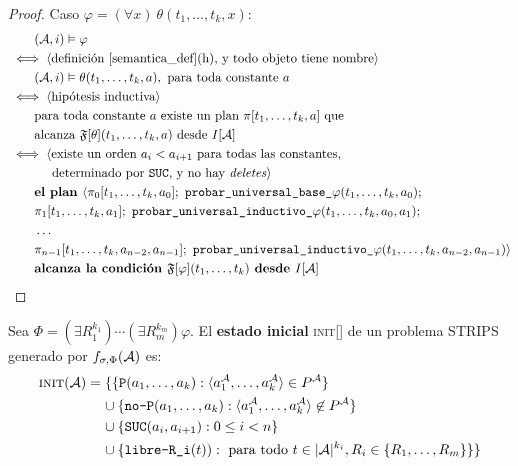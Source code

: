 \begin{proof}
Caso $\varphi = (\forall x)\ \theta(t_1,\ldots,t_k,x):$
\begin{alignat*}{1}
& \quad \quad (\A, i) \models \varphi\\
& \iff \tup{\text{definición \ref{semantica_def}(h), y todo objeto tiene nombre}}\\
& \quad \quad (\A, i) \models \theta(t_1,\ldots,t_k,a), \text{ para toda
constante $a$}\\
& \iff \tup{\text{hipótesis inductiva}}\\
& \quad\quad \text{para toda constante $a$ existe un plan $\pi[t_1,\ldots,t_k,a]$ que}\\
& \quad\quad \text{alcanza $\FT[\theta](t_1,\ldots,t_k,a)$ desde } I[\A]\\
& \iff \langle \text{existe un orden $a_i < a_{i+1}$ para todas las constantes,}\\
& {\color{white} \iff \langle} \text{ determinado por \texttt{SUC}, y no hay
\textit{deletes}} \rangle\\
& \quad \quad \textbf{el plan } \langle \pi_0[t_1,\ldots,t_k,a_0];\
\texttt{probar\_universal\_base\_}\varphi(t_1,\ldots,t_k,a_0);\\
& \quad \quad \pi_1[t_1,\ldots,t_k,a_1];\
\texttt{probar\_universal\_inductivo\_}\varphi(t_1,\ldots,t_k,a_0,a_1);\\
& \quad \quad \ldots\ \\
& \quad \quad \pi_{n-1}[t_1,\ldots,t_k,a_{n-2},a_{n-1}];\
\texttt{probar\_universal\_inductivo\_}\varphi(t_1,\ldots,t_k,a_{n-2},a_{n-1}) \rangle\\
& \quad \quad \textbf{alcanza la condición } \FT[\varphi](t_1,\ldots,t_k)
\textbf{ desde } I[\A]
\end{alignat*}
\end{proof}

\begin{definition}
Sea $\Phi = (\exists R_1^{k_1})\cdots(\exists R_m^{k_m}) \varphi$.
El \textbf{estado inicial} \textsc{init}[\A] de un problema STRIPS generado por
$f_{\sigma,\Phi}(\mathcal{A})$ es:
\begin{alignat*}{1}
& \textsc{init}(\A) = \{\{ \texttt{P}(a_1,\ldots,a_k) :
\tup{a_1^\A,\ldots,a_k^\A} \in P^\A\}\\
& {\color{white} \texttt{init}[\A] = } \cup \{\texttt{no-P}(a_1,\ldots,a_k) : \tup{a_1^\A,\ldots,a_k^\A} \not\in P^\A\}\\
& {\color{white} \texttt{init}[\A] = } \cup \{\texttt{SUC}(a_i, a_{i+1}) : 0 \leq i < n \} \\
& {\color{white} \texttt{init}[\A] = } \cup \{\texttt{libre-R\_i}(t)) : \text{ para todo $t \in |\A|^{k_i}$},
R_i\in\{R_1,\ldots,R_m\}\} \}
\end{alignat*}
\end{definition}

